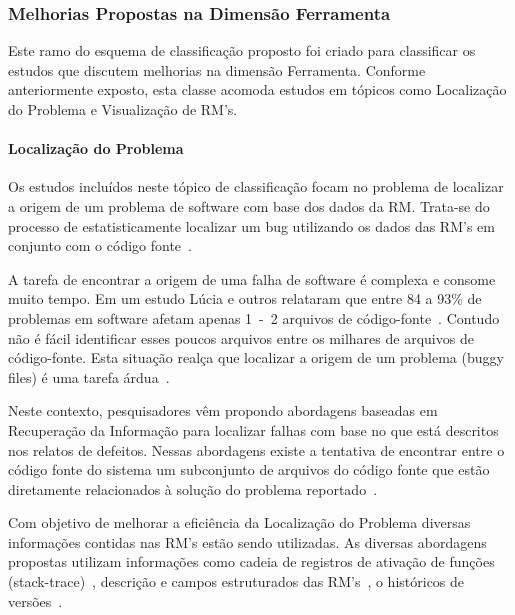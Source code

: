 \subsubsection{Melhorias Propostas na Dimensão Ferramenta}
\label{ssub:melhorias_dim_ferramenta}

Este ramo do esquema de classificação proposto foi criado para classificar os
estudos que discutem melhorias na dimensão Ferramenta. Conforme anteriormente
exposto, esta classe acomoda estudos em tópicos como Localização do Problema e
Visualização de RM's.

\paragraph{Localização do Problema} Os estudos incluídos neste tópico de
classificação focam no problema de localizar a origem de um problema de software
com base dos dados da RM\@. Trata-se do processo de estatisticamente localizar
um bug utilizando os dados das RM's em conjunto com o código
fonte~\cite{Hovemeyer:2004:FBE:1052883.1052895}.

A tarefa de encontrar a origem de uma falha de software é complexa e consome
muito tempo. Em um estudo Lúcia e outros relataram que entre 84 a 93\% de
problemas em software afetam apenas 1~-~2 arquivos de
código-fonte~\cite{thung2012faults}. Contudo não é fácil identificar esses
poucos arquivos entre os milhares de arquivos de código-fonte. Esta situação
realça que localizar a origem de um problema (buggy files) é uma tarefa
árdua~\cite{Thung:2014:BIT:2635868.2661678}.

Neste contexto, pesquisadores vêm propondo abordagens baseadas em Recuperação da
Informação para localizar falhas com base no que está descritos nos relatos de
defeitos. Nessas abordagens existe a tentativa de encontrar entre o código fonte
do sistema um subconjunto de arquivos do código fonte que estão diretamente
relacionados à solução do problema
reportado~\cite{Wong:2014:BBF:2705615.2706096}.

Com objetivo de melhorar a eficiência da Localização do Problema diversas
informações contidas nas RM's estão sendo utilizadas. As diversas abordagens
propostas utilizam informações como cadeia de registros de ativação de funções
(stack-trace)~\cite{Wong:2014:BBF:2705615.2706096}, des\-cri\-ção e campos
estruturados das RM's~\cite{Thung:2014:BIT:2635868.2661678}, o históricos de
versões~\cite{Bangcharoensap:2012:LSC:2419061.2419428,corley2011recovering,Romo:2015:TAT:2745802.2745833}.

